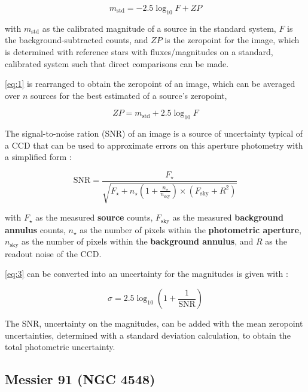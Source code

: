 \documentclass[11pt, a4paper, twocolumn]{article}
\begin{document}
\begin{equation} \label{eq:1}
    m_{\text{std}} = -2.5 \log_{10} F + ZP
\end{equation}

with $m_{\text{std}}$ as the calibrated magnitude of a source in the standard system, $F$ is the background-subtracted counts, 
and $ZP$ is the zeropoint for the image, which is determined with reference stars with fluxes/magnitudes on a standard, calibrated system such
that direct comparisons can be made. \cite{photucd}

\autoref{eq:1} is rearranged to obtain the zeropoint of an image, which can be averaged over $n$ sources for the best estimated of a source's 
zeropoint, \cite{photucd}

\begin{equation} \label{eq:2}
    ZP = m_{\text{std}} + 2.5\log_{10}F
\end{equation}

The signal-to-noise ration (SNR) of an image is a source of uncertainty typical of a CCD that can be used to approximate errors on this
aperture photometry with a simplified form \cite{photucd}:

\begin{equation} \label{eq:3}
    \text{SNR} = \frac{F_{\star}}{\sqrt{F_{\star} + n_{\star} \left( 1 + \frac{n_{\star}}{n_{\text{sky}}} \right) \times (F_{\text{sky}} + R^2)}}
\end{equation}

with $F_{\star}$ as the measured \textbf{source} counts, $F_{\text{sky}}$ as the measured \textbf{background annulus} counts, $n_{\star}$ as
the number of pixels within the \textbf{photometric aperture}, $n_{\text{sky}}$ as the number of pixels within the \textbf{background annulus},
and $R$ as the readout noise of the CCD. \cite{photucd}

\autoref{eq:3} can be converted into an uncertainty for the magnitudes is given with \cite{photucd}:

\begin{equation} \label{eq:4}
    \sigma = 2.5 \log_{10}\left( 1 + \frac{1}{\text{SNR}} \right)
\end{equation}

The SNR, uncertainty on the magnitudes, can be added with the mean zeropoint uncertainties, determined with a standard deviation calculation, to
obtain the total photometric uncertainty. \cite{photucd}

\subsection{Messier 91 (NGC 4548)}
\end{document}
